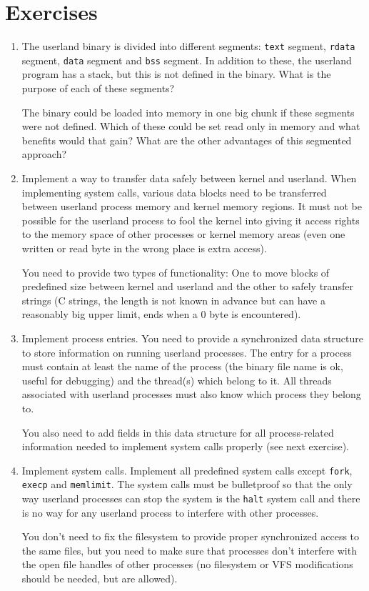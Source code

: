 \documentclass[twoside,a4paper]{report}
\newenvironment{exercises}[1][\addcontentsline{toc}{section}{Exercises}%
\section*{Exercises}\markright{EXERCISES}]{%
#1%
\begin{enumerate}%
}{%
\end{enumerate}
}
\newcounter{exercisec}[chapter]
\newcommand{\exercise}[1]{%
\item[\stepcounter{exercisec}\arabic{chapter}.\theexercisec{}.] #1%
}
\newcommand{\cexercise}[1]{%
\item[\stepcounter{exercisec}{\huge\Keyboard}\hspace{5mm}\textbf{\arabic{chapter}.\theexercisec{}.}] #1%
}
\begin{document}
\begin{exercises}

\exercise{The userland binary is divided into different segments:
\texttt{text} segment, \texttt{rdata} segment, \texttt{data} segment
and \texttt{bss} segment. In addition to these, the userland program
has a stack, but this is not defined in the binary. What is the purpose of
each of these segments?

The binary could be loaded into memory in one big chunk if these
segments were not defined. Which of these could be set read only in
memory and what benefits would that gain? What are the other
advantages of this segmented approach?}

\cexercise{Implement a way to transfer data safely between kernel and
userland. When implementing system calls, various data blocks need to
be transferred between userland process memory and kernel memory
regions. It must not be possible for the userland process to fool the
kernel into giving it access rights to the memory space of other
processes or kernel memory areas (even one written or read byte in the
wrong place is extra access).

You need to provide two types of functionality: One to move blocks of
predefined size between kernel and userland and the other to safely
transfer strings (C strings, the length is not known in advance but
can have a reasonably big upper limit, ends when a 0 byte is
encountered).}

\cexercise{Implement process entries. You need to provide a
synchronized data structure to store information on running userland
processes. The entry for a process must contain at least the name of
the process (the binary file name is ok, useful for debugging) and the
thread(s) which belong to it. All threads associated with userland
processes must also know which process they belong to.

You also need to add fields in this data structure for all
process-related information needed to implement system calls properly
(see next exercise).}

\cexercise{Implement system calls. Implement all predefined system
calls except \texttt{fork}, \texttt{execp} and \texttt{memlimit}. The
system calls must be bulletproof so that the only way userland
processes can stop the system is the \texttt{halt} system call and
there is no way for any userland process to interfere with other
processes.

You don't need to fix the filesystem to provide proper synchronized
access to the same files, but you need to make sure that processes
don't interfere with the open file handles of other processes (no
filesystem or VFS modifications should be needed, but are allowed).

}
\end{exercises}
\end{document}
